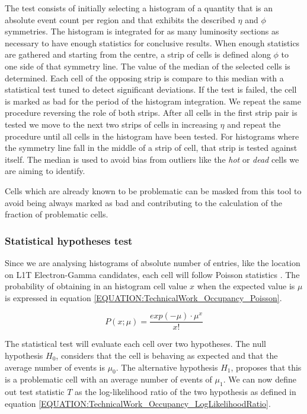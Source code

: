 The test consists of initially selecting a histogram of a quantity that is an absolute event count per region and that exhibits the described $\eta$ and $\phi$ symmetries. The histogram is integrated for as many luminosity sections as necessary to have enough statistics for conclusive results. When enough statistics are gathered and starting from the centre, a strip of cells is defined along $\phi$ to one side of that symmetry line. The value of the median of the selected cells is determined. Each cell of the opposing strip is compare to this median with a statistical test tuned to detect significant deviations. If the test is failed, the cell is marked as bad for the period of the histogram integration. We repeat the same procedure reversing the role of both strips. After all cells in the first strip pair is tested we move to the next two strips of cells in increasing $\eta$ and repeat the procedure until all cells in the histogram have been tested. For histograms where the symmetry line fall in the middle of a strip of cell, that strip is tested against itself. The median is used to avoid bias from outliers like the \textit{hot} or \textit{dead} cells we are aiming to identify. 

Cells which are already known to be problematic can be masked from this tool to avoid being always marked as bad and contributing to the calculation of the fraction of problematic cells.

\subsubsection{Statistical hypotheses test}

Since we are analysing histograms of absolute number of entries, like the location on \gls{L1T} Electron-Gamma candidates, each cell will follow Poisson statistics \cite{BOOK:AppliedStatisticsAndProbabilityforEngineers}. The probability of obtaining in an histogram cell value $x$ when the expected value is $\mu$ is expressed in equation \ref{EQUATION:TechnicalWork_Occupancy_Poisson}.

\begin{equation}
P(x;\mu)=\frac{exp(-\mu) \cdot \mu^{x}}{x!}
\label{EQUATION:TechnicalWork_Occupancy_Poisson}
\end{equation}

The statistical test will evaluate each cell over two hypotheses. The null hypothesis $H_0$, considers that the cell is behaving as expected and that the average number of events is $\mu_0$. The alternative hypothesis $H_1$, proposes that this is a problematic cell with an average number of events of $\mu_1$. We can now define out test statistic $T$ as the log-likelihood ratio of the two hypothesis as defined in equation \ref{EQUATION:TechnicalWork_Occupancy_LogLikelihoodRatio}.

